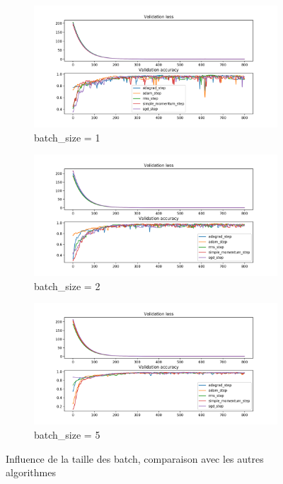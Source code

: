 \documentclass[fleqn,11pt, titlepage, french]{article}
\begin{document}
	\begin{figure}[H]
	\centering
	\begin{subfigure}{0.45\textwidth}
		\centering
		\includegraphics[scale=0.25]{../gdsvm/exports/mnist-batch1-comparison.png}
		\caption{batch\_size = 1}
	\end{subfigure}
	\begin{subfigure}{0.45\textwidth}
		\centering
		\includegraphics[scale=0.25]{../gdsvm/exports/mnist-batch2-comparison.png}
		\caption{batch\_size = 2}
	\end{subfigure}
	\begin{subfigure}{1\textwidth}
		\centering
		\includegraphics[scale=0.4]{../gdsvm/exports/mnist-batch5-comparison.png}
		\caption{batch\_size = 5}
	\end{subfigure}
	
	\caption{Influence de la taille des batch, comparaison avec les autres algorithmes}
\end{figure}
\end{document}
